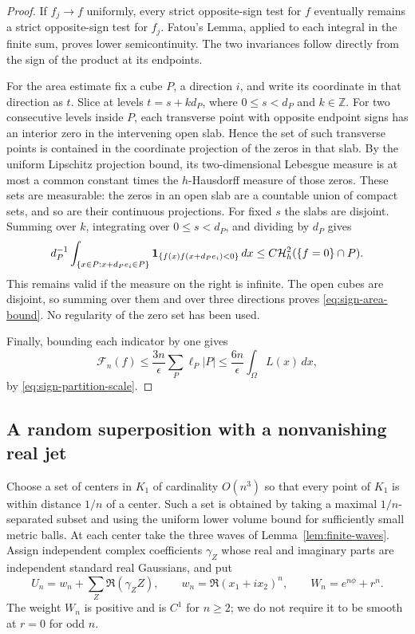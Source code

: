 \begin{proof}
If $f_j\to f$ uniformly, every strict opposite-sign test for $f$
eventually remains a strict opposite-sign test for $f_j$.  Fatou's
Lemma, applied to each integral in the finite sum, proves lower
semicontinuity.  The two invariances follow directly from the sign
of the product at its endpoints.

For the area estimate fix a cube $P$, a direction $i$, and write its
coordinate in that direction as $t$.  Slice at levels $t=s+kd_P$,
where $0\le s<d_P$ and $k\in\mathbb Z$.  For two consecutive levels
inside $P$, each transverse point with opposite endpoint signs has
an interior zero in the intervening open slab.  Hence the set of such
transverse points is contained in the coordinate projection of the
zeros in that slab.  By the uniform Lipschitz projection bound, its
two-dimensional Lebesgue measure is at most a common constant times
the $h$-Hausdorff measure of those zeros.  These sets are measurable:
the zeros in an open slab are a countable union of compact sets, and
so are their continuous projections.  For fixed $s$ the slabs are
disjoint.  Summing over $k$, integrating over $0\le s<d_P$, and
dividing by $d_P$ gives
\[
 d_P^{-1}\int_{\{x\in P:x+d_Pe_i\in P\}}
  \mathbf1_{\{f(x)f(x+d_Pe_i)<0\}}\,dx
       \le C\mathcal H_h^2(\{f=0\}\cap P).
\]
This remains valid if the measure on the right is infinite.
The open cubes are disjoint, so summing over them and over three
directions proves \eqref{eq:sign-area-bound}.  No regularity
of the zero set has been used.

Finally, bounding each indicator by one gives
\[
 \mathcal F_n(f)\le\frac{3n}{\epsilon}
        \sum_P\ell_P|P|
       \le\frac{6n}{\epsilon}\int_\Omega L(x)\,dx,
\]
by \eqref{eq:sign-partition-scale}.
\end{proof}

\subsection{A random superposition with a nonvanishing real jet}

Choose a set of centers in $K_1$ of cardinality $O(n^3)$ so that every
point of $K_1$ is within distance $1/n$ of a center.  Such a set is
obtained by taking a maximal $1/n$-separated subset and using the
uniform lower volume bound for sufficiently small metric balls.  At
each center take the three waves of Lemma~\ref{lem:finite-waves}.
Assign independent complex coefficients $\gamma_Z$ whose real and
imaginary parts are independent standard real Gaussians, and put
\begin{equation}
 U_n=w_n+\sum_Z\Re(\gamma_Z Z),
 \qquad w_n=\Re(x_1+ix_2)^n,
 \qquad W_n=e^{n\phi}+r^n.
 \label{eq:wave-weight}
\end{equation}
The weight $W_n$ is positive and is $C^1$ for $n\ge2$; we do not
require it to be smooth at $r=0$ for odd $n$.

